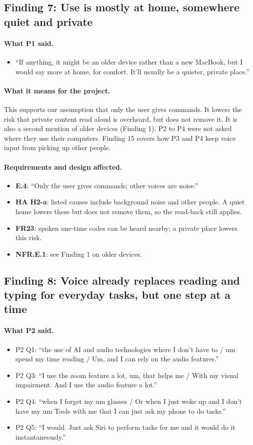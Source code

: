 \documentclass[12pt, titlepage]{article}
\newcommand{\said}{\paragraph{What P1 said.}}
\newcommand{\saidtwo}{\paragraph{What P2 said.}}
\newcommand{\means}{\paragraph{What it means for the project.}}
\newcommand{\affects}{\paragraph{Requirements and design affected.}}
\begin{document}
\subsection{Finding 7: Use is mostly at home, somewhere quiet and private}

\said
\begin{itemize}
    \item ``If anything, it might be an older device rather than a new MacBook, but I would say more at home, for comfort. It'll usually be a quieter, private place.''
\end{itemize}

\means
This supports our assumption that only the user gives commands. It lowers the risk that private content read aloud is overheard, but does not remove it. It is also a second mention of older devices (Finding 1). P2 to P4 were not asked where they use their computers. Finding 15 covers how P3 and P4 keep voice input from picking up other people.

\affects
\begin{itemize}
    \item \textbf{E.4}: ``Only the user gives commands; other voices are noise.''
    \item \textbf{HA H2-a}: listed causes include background noise and other people. A quiet home lowers these but does not remove them, so the read-back still applies.
    \item \textbf{FR23}: spoken one-time codes can be heard nearby; a private place lowers this risk.
    \item \textbf{NFR.E.1}: see Finding 1 on older devices.
\end{itemize}

\subsection{Finding 8: Voice already replaces reading and typing for everyday tasks, but one step at a time}

\saidtwo
\begin{itemize}
    \item P2 Q1: ``the use of AI and audio technologies where I don't have to / um spend my time reading / Um, and I can rely on the audio features.''
    \item P2 Q3: ``I use the zoom feature a lot, um, that helps me / With my visual impairment. And I use the audio feature a lot.''
    \item P2 Q4: ``when I forget my um glasses / Or when I just woke up and I don't have my um Tools with me that I can just ask my phone to do tasks.''
    \item P2 Q5: ``I would. Just ask Siri to perform tasks for me and it would do it instantaneously.''
\end{itemize}
\end{document}
